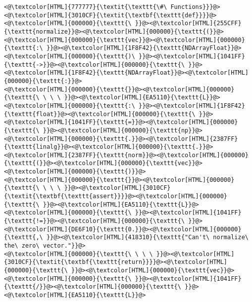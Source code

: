 \begin{lstlisting}
<@\textcolor[HTML]{777777}{\textit{\texttt{\#\ Functions}}}@>
<@\textcolor[HTML]{3010CF}{\textit{\textbf{\texttt{def}}}}@><@\textcolor[HTML]{000000}{\texttt{\ }}@><@\textcolor[HTML]{255CFF}{\texttt{normalize}}@><@\textcolor[HTML]{000000}{\texttt{(}}@><@\textcolor[HTML]{000000}{\texttt{vec}}@><@\textcolor[HTML]{000000}{\texttt{:\ }}@><@\textcolor[HTML]{1F8F42}{\texttt{NDArrayFloat}}@><@\textcolor[HTML]{000000}{\texttt{)\ }}@><@\textcolor[HTML]{1041FF}{\texttt{->}}@><@\textcolor[HTML]{000000}{\texttt{\ }}@><@\textcolor[HTML]{1F8F42}{\texttt{NDArrayFloat}}@><@\textcolor[HTML]{000000}{\texttt{:}}@>
<@\textcolor[HTML]{000000}{\texttt{}}@><@\textcolor[HTML]{000000}{\texttt{\ \ \ \ }}@><@\textcolor[HTML]{EA5110}{\texttt{L}}@><@\textcolor[HTML]{000000}{\texttt{:\ }}@><@\textcolor[HTML]{1F8F42}{\texttt{float}}@><@\textcolor[HTML]{000000}{\texttt{\ }}@><@\textcolor[HTML]{1041FF}{\texttt{=}}@><@\textcolor[HTML]{000000}{\texttt{\ }}@><@\textcolor[HTML]{000000}{\texttt{np}}@><@\textcolor[HTML]{000000}{\texttt{.}}@><@\textcolor[HTML]{2387FF}{\texttt{linalg}}@><@\textcolor[HTML]{000000}{\texttt{.}}@><@\textcolor[HTML]{2387FF}{\texttt{norm}}@><@\textcolor[HTML]{000000}{\texttt{(}}@><@\textcolor[HTML]{000000}{\texttt{vec}}@><@\textcolor[HTML]{000000}{\texttt{)}}@>
<@\textcolor[HTML]{000000}{\texttt{}}@><@\textcolor[HTML]{000000}{\texttt{\ \ \ \ }}@><@\textcolor[HTML]{3010CF}{\textit{\textbf{\texttt{assert}}}}@><@\textcolor[HTML]{000000}{\texttt{\ }}@><@\textcolor[HTML]{EA5110}{\texttt{L}}@><@\textcolor[HTML]{000000}{\texttt{\ }}@><@\textcolor[HTML]{1041FF}{\texttt{!=}}@><@\textcolor[HTML]{000000}{\texttt{\ }}@><@\textcolor[HTML]{DE6F10}{\texttt{0.}}@><@\textcolor[HTML]{000000}{\texttt{,\ }}@><@\textcolor[HTML]{418310}{\texttt{"Can't\ normalize\ the\ zero\ vector."}}@>
<@\textcolor[HTML]{000000}{\texttt{\ \ \ \ }}@><@\textcolor[HTML]{3010CF}{\textit{\textbf{\texttt{return}}}}@><@\textcolor[HTML]{000000}{\texttt{\ }}@><@\textcolor[HTML]{000000}{\texttt{vec}}@><@\textcolor[HTML]{000000}{\texttt{\ }}@><@\textcolor[HTML]{1041FF}{\texttt{/}}@><@\textcolor[HTML]{000000}{\texttt{\ }}@><@\textcolor[HTML]{EA5110}{\texttt{L}}@>



\end{lstlisting}
